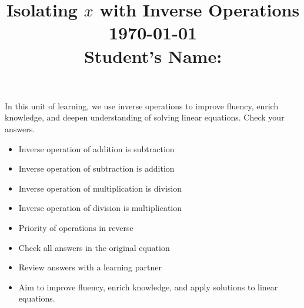 \documentclass[12pt, a4paper, addpoints]{exam}
\title{\large Isolating \( x \) with Inverse Operations \\ \dayofweekname{\day}{\month}{\year} \today \\ \vspace{2mm} \quad Student's Name: \underline{\hspace{8cm}}}
\date{}
\begin{document}
\maketitle

\LARGE
\noindent 
In this unit of learning, we use inverse operations to improve fluency, enrich knowledge, and deepen understanding of solving linear equations. Check your answers.

\begin{mdframed}[backgroundcolor=gray!10]
    \begin{multicols}{2}
        \large
        \begin{itemize}
            \item Inverse operation of addition is subtraction
            \item Inverse operation of subtraction is addition
            \item Inverse operation of multiplication is division
            \item Inverse operation of division is multiplication
            \item Priority of operations in reverse
            \item Check all answers in the original equation 
            \item Review answers with a learning partner
            \item Aim to improve fluency, enrich knowledge, and apply solutions to linear equations.
        \end{itemize}
    \end{multicols}
\end{mdframed}

\small
\begin{multicols}{2}
    \tableofcontents
\end{multicols}
\newpage
\end{document}
